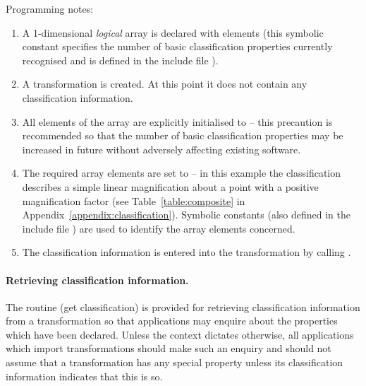 Programming notes: 

\begin{enumerate} 

\item A 1-dimensional {\em logical} array  is declared with
 elements (this symbolic constant specifies the number
of basic classification properties currently recognised and is defined in
the include file ). 

\item A transformation is created.
At this point it does not contain any classification information. 

\item All elements of the  array are explicitly initialised
to  -- this precaution is recommended so that the number of
basic classification properties may be increased in future without adversely
affecting existing software. 

\item The required array elements are set to  -- in this
example the classification describes a simple linear magnification about a
point with a positive magnification factor (see Table~\ref{table:composite}
in Appendix~\ref{appendix:classification}). 
Symbolic constants (also defined in the include file ) are
used to identify the array elements concerned. 

\item The classification information is entered into the transformation by
calling . 

\end{enumerate}
\exampledone 

\paragraph{Retrieving classification information.}
The routine  (get classification) is provided for retrieving
classification information from a transformation so that applications may
enquire about the properties which have been declared.
Unless the context dictates otherwise, all applications which import
transformations should make such an enquiry and should not assume that a
transformation has any special property unless its classification
information indicates that this is so. 


